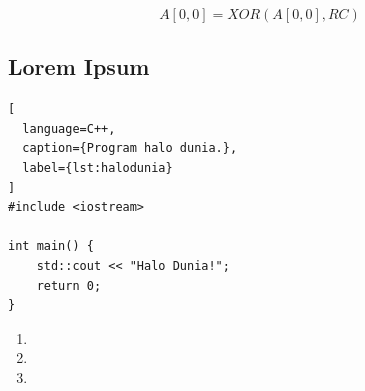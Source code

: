 \begin{equation}
  \label{eq:iota}
  A[0,0]=XOR(A[0,0], RC)
\end{equation}



\subsection{Lorem Ipsum}
\label{subsec:loremipsum}

\lipsum[11]


\begin{lstlisting}[
  language=C++,
  caption={Program halo dunia.},
  label={lst:halodunia}
]
#include <iostream>

int main() {
    std::cout << "Halo Dunia!";
    return 0;
}
\end{lstlisting}

\lipsum[12]

\begin{enumerate}
  \item \lipsum[13][1-4]
  \item \lipsum[13][5-8]
  \item \lipsum[13][9-12]
\end{enumerate}

\lipsum[14-15]
